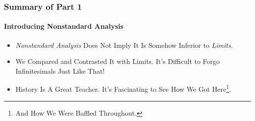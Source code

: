 \begin{frame}
\frametitle{Summary of Part 1}
\framesubtitle{Introducing Nonstandard Analysis}
\label{slide:summary-part-1}
\begin{itemize}
\pause
\item \textit{Nonstandard Analysis} Does Not Imply It Is Somehow Inferior to \textit{\alert{Limits}}.
\pause
\item We Compared and Contrasted It with Limits. It's \alert{Difficult to Forgo Infinitesimals Just Like That}!
\pause
\item History Is A Great Teacher. It's Fascinating to See How We Got Here\footnote{And How We Were Baffled Throughout.}.
\end{itemize}
\end{frame}
